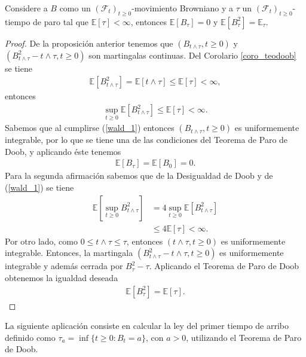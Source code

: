 \begin{proposition}
Considere a $B$ como un $(\mathcal{F}_t)_{t \geq 0}$-movimiento Browniano y a $\tau$ un $(\mathcal{F}_t)_{t \geq 0}$-tiempo de paro tal que $\mathbb{E}[\tau] < \infty$, entonces $\mathbb{E}[B_{\tau}] = 0$ y $\mathbb{E}[B_{\tau}^2] = \mathbb{E_{\tau}}$.
\end{proposition}
\begin{proof}
De la proposición anterior tenemos que $(B_{t \wedge \tau}, t \geq 0)$ y $(B_{t \wedge \tau}^2 - t \wedge \tau, t \geq 0)$ son martingalas continuas. Del Corolario \ref{coro_teodoob} se tiene
\begin{align*}
\mathbb{E}[B_{t \wedge \tau}^2] = \mathbb{E}[t \wedge \tau] \leq \mathbb{E}[\tau] < \infty, 
\end{align*}
entonces
\begin{align}
\sup_{t \geq 0} \mathbb{E}[B_{t \wedge \tau}^2] \leq \mathbb{E}[\tau] < \infty. \label{wald_1}
\end{align}
Sabemos que al cumplirse (\ref{wald_1}) entonces $(B_{t \wedge \tau}, t \geq 0)$ es uniformemente integrable, por lo que se tiene una de las condiciones del Teorema de Paro de Doob, y aplicando éste tenemos
\begin{align*}
\mathbb{E}[B_{\tau}] = \mathbb{E}[B_0] = 0.
\end{align*}
Para la segunda afirmación sabemos que de la Desigualdad de Doob y de (\ref{wald_1}) se tiene
\begin{align*}
\mathbb{E} \left[ \sup_{t \geq 0} B^2_{t \wedge \tau} \right] & = 4 \sup_{t \geq 0} \mathbb{E}[B_{t \wedge \tau}^2] \\
& \leq 4\mathbb{E}[\tau] < \infty.
\end{align*}
Por otro lado, como $0 \leq t \wedge \tau \leq \tau$, entonces $(t \wedge \tau, t \geq 0)$ es uniformemente integrable. Entonces, la martingala $(B_{t \wedge \tau}^2 - t \wedge \tau, t \geq 0)$ es uniformemente integrable y además cerrada por $B^2_{\tau} - \tau$. Aplicando el Teorema de Paro de Doob obtenemos la igualdad deseada
\begin{align*}
\mathbb{E}[B^2_{\tau}] = \mathbb{E}[\tau].
\end{align*}
\end{proof}

La siguiente aplicación consiste en calcular la ley del primer tiempo de arribo definido como $\tau_a = \inf \{ t \geq 0 : B_t = a \}$, con $a > 0$, utilizando el Teorema de Paro de Doob. 

